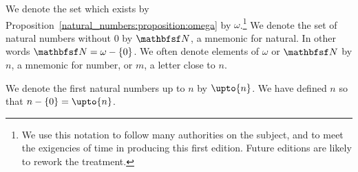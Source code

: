 We denote the set which exists by Proposition~\ref{natural_numbers:proposition:omega} by $\omega$.\footnote{We use this notation to follow many authorities on the subject, and to meet the exigencies of time in producing this first edition. Future editions are likely to rework the treatment.}
We denote the set of natural numbers without 0 by $\N$, a mnemonic for natural.
In other words $\N = \omega - \set{0}$.
We often denote elements of $\omega$ or $\N$ by $n$, a mnemonic for number, or $m$, a letter close to $n$.

We denote the first natural numbers up to $n$ by $\upto{n}$.
We have defined $n$ so that $n - \set{0} = \upto{n}$.


%
%
%

%
%
%
%
%
%
%
%
%
